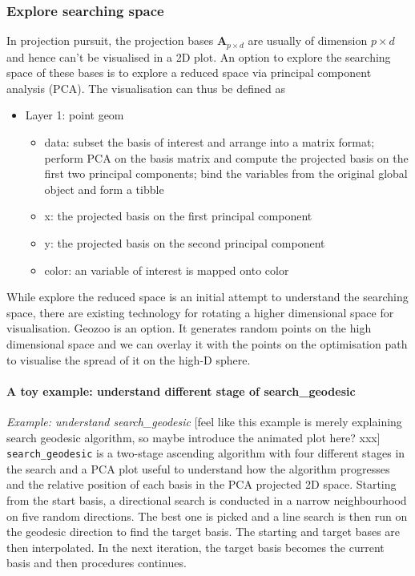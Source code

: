 \documentclass[12pt]{article}
\providecommand{\tightlist}{%
  \setlength{\itemsep}{0pt}\setlength{\parskip}{0pt}}
\begin{document}
\newpage

\hypertarget{animated}{%
\subsubsection{Explore searching space}\label{animated}}

In projection pursuit, the projection bases \(\mathbf{A}_{p \times d}\)
are usually of dimension \(p \times d\) and hence can't be visualised in
a 2D plot. An option to explore the searching space of these bases is to
explore a reduced space via principal component analysis (PCA). The
visualisation can thus be defined as

\begin{itemize}
\tightlist
\item
  Layer 1: point geom

  \begin{itemize}
  \tightlist
  \item
    data: subset the basis of interest and arrange into a matrix format;
    perform PCA on the basis matrix and compute the projected basis on
    the first two principal components; bind the variables from the
    original global object and form a tibble
  \item
    x: the projected basis on the first principal component
  \item
    y: the projected basis on the second principal component
  \item
    color: an variable of interest is mapped onto color
  \end{itemize}
\end{itemize}

While explore the reduced space is an initial attempt to understand the
searching space, there are existing technology for rotating a higher
dimensional space for visualisation. Geozoo is an option. It generates
random points on the high dimensional space and we can overlay it with
the points on the optimisation path to visualise the spread of it on the
high-D sphere.

\hypertarget{a-toy-example-understand-different-stage-of-search_geodesic}{%
\paragraph{A toy example: understand different stage of
search\_geodesic}\label{a-toy-example-understand-different-stage-of-search_geodesic}}

\emph{Example: understand search\_geodesic} {[}feel like this example is
merely explaining search geodesic algorithm, so maybe introduce the
animated plot here? xxx{]} \texttt{search\_geodesic} is a two-stage
ascending algorithm with four different stages in the search and a PCA
plot useful to understand how the algorithm progresses and the relative
position of each basis in the PCA projected 2D space. Starting from the
start basis, a directional search is conducted in a narrow neighbourhood
on five random directions. The best one is picked and a line search is
then run on the geodesic direction to find the target basis. The
starting and target bases are then interpolated. In the next iteration,
the target basis becomes the current basis and then procedures
continues.
\end{document}
